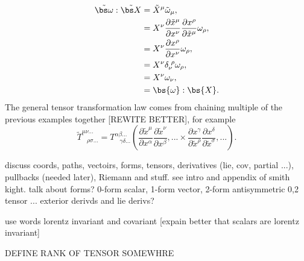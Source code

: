 \begin{align}
\tilde{\bs \omega} : \tilde{\bs X} &= \tilde{X}^\mu \tilde{\omega}_\mu ,\\
                                   &= {X}^\nu \frac{\partial \tilde{x}^\mu}{\partial x^\nu}   \frac{\partial x^\rho}{\partial \tilde{x}^\mu}\omega_\rho, \\
                                   &=X^\nu \frac{\partial x^\rho}{\partial x^\nu} \omega_\rho , \\
                                   &=X^\nu \delta_\nu^{\,\,\rho} \omega_\rho , \\
                                   &=X^\nu\omega_\nu,\\
                                   &= \bs{\omega}:\bs{X}.
\end{align}
The general tensor transformation law comes from chaining multiple of the previous examples together [REWITE BETTER], for example
\begin{equation}
\tilde{T}^{\mu\nu...}_{\,\,\,\,\,\rho\sigma...} = T^{\alpha\beta...}_{\,\,\,\,\,\gamma\delta...}\left(
\frac{\partial \tilde{x}^\mu}{\partial x^\alpha}\frac{\partial \tilde{x}^\nu}{\partial x^\beta},...\times\frac{\partial x^\gamma}{\partial \tilde{x}^\rho}\frac{\partial x^\delta}{\partial \tilde{x}^\sigma},...\right).
\end{equation}


discuss coords, paths, vectoirs, forms, tensors, derivatives (lie, cov, partial ...), pullbacks (needed later), Riemann and stuff. see intro and appendix of smith kight. talk about forms? 0-form scalar, 1-form vector, 2-form antisymmetric 0,2 tensor ... exterior derivds and lie derivs?

use words lorentz invariant and covariant
[expain better that scalars are lorentz invariant]

DEFINE RANK OF TENSOR SOMEWHRE






